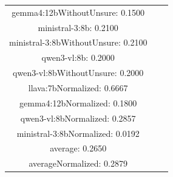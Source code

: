 \documentclass[a4paper]{article}
\begin{document}
\begin{tabular}{ccc}
gemma4:12bWithoutUnsure: 0.1500 \\ ministral-3:8b: 0.2100 \\ ministral-3:8bWithoutUnsure: 0.2100 \\ qwen3-vl:8b: 0.2000 \\ qwen3-vl:8bWithoutUnsure: 0.2000 \\ llava:7bNormalized: 0.6667 \\ gemma4:12bNormalized: 0.1800 \\ qwen3-vl:8bNormalized: 0.2857 \\ ministral-3:8bNormalized: 0.0192 \\ average: 0.2650 \\ averageNormalized: 0.2879 \end{minipage}\\
\end{tabular}

\vspace{5mm}
\end{document}
